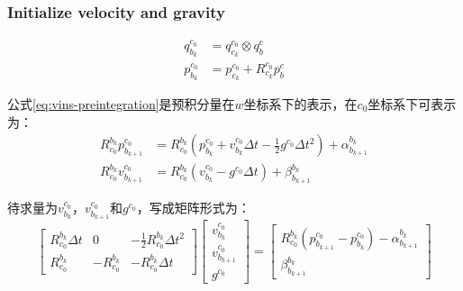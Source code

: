\subsubsection{Initialize velocity and gravity}
\begin{equation} \label{eq:vins-transform}
	\begin{split}
		q_{b_k}^{c_0} &= q_{c_k}^{c_0} \otimes q_b^c \\
		p_{b_k}^{c_0} &= p_{c_k}^{c_0} + R_{c_k}^{c_0} p_b^c
	\end{split}
\end{equation}
\par 公式\ref{eq:vins-preintegration}是预积分量在$w$坐标系下的表示，在$c_0$坐标系下可表示为：
\begin{equation}
	\begin{split}
		R_{c_0}^{b_k}p_{b_{k+1}}^{c_0} &= R_{c_0}^{b_k}( p_{b_k}^{c_0} + v_{b_k}^{c_0}\Delta{t} - \frac12g^{c_0}\Delta{t}^2) + \alpha_{b_{k+1}}^{b_k} \\
		R_{c_0}^{b_k}v_{b_{k+1}}^{c_0} &= R_{c_0}^{b_k}( v_{b_k}^{c_0} - g^{c_0}\Delta{t} ) + \beta_{b_{k+1}}^{b_k}
	\end{split}
\end{equation}
\par 待求量为$v_{b_k}^{c_0}$，$v_{b_{k+1}}^{c_0}$和$g^{c_0}$，写成矩阵形式为：
\begin{equation}
	\begin{bmatrix}
		R_{c_0}^{b_k}\Delta{t} & 0              & -\frac12R_{c_0}^{b_k}\Delta{t}^2 \\
		R_{c_0}^{b_k}          & -R_{c_0}^{b_k} & -R_{c_0}^{b_k}\Delta{t}
	\end{bmatrix}
	\begin{bmatrix}
		v_{b_k}^{c_0} \\ v_{b_{k+1}}^{c_0} \\ g^{c_0}
	\end{bmatrix}
	=
	\begin{bmatrix}
		R_{c_0}^{b_k} (p_{b_{k+1}}^{c_0}-p_{b_k}^{c_0}) - \alpha_{b_{k+1}}^{b_k} \\
		\beta_{b_{k+1}}^{b_k}
	\end{bmatrix}
\end{equation}
